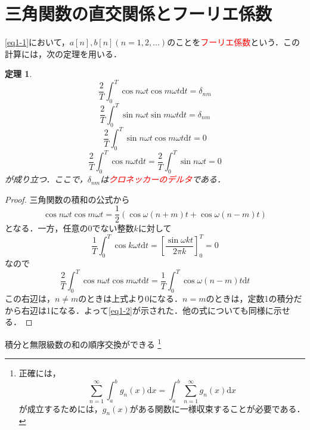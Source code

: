 \documentclass[a4j]{jsbook}
\newtheorem{theorem}{定理}
\numberwithin{theorem}{chapter}  %
\begin{document}
\section{三角関数の直交関係とフーリエ係数} \label{sec1-2}
\eqref{eq1-1}において，\(a[n], b[n](n=1, 2, \dots)\)のことを\textcolor{red}{フーリエ係数}という．この計算には，次の定理を用いる．
\begin{theorem}
\label{th1-1}
\begin{equation}
    \frac{2}{T}\int_0^T \cos n\omega t\cos m\omega t\mathrm{d}t=\delta_{nm} \label{eq1-2}
\end{equation}
\begin{equation}
    \frac{2}{T}\int_0^T \sin n\omega t\sin m\omega t\mathrm{d}t=\delta_{nm} \label{eq1-3}
\end{equation}
\begin{equation}
    \frac{2}{T}\int_0^T \sin n\omega t\cos m\omega t\mathrm{d}t=0 \label{eq1-4}
\end{equation}
\begin{equation}
    \frac{2}{T}\int_0^T \cos n\omega t\mathrm{d}t=\frac{2}{T}\int_0^T \sin n\omega t=0 \label{eq1-5}
\end{equation}
が成り立つ．ここで，\(\delta_{nm}\)は\textcolor{red}{クロネッカーのデルタ}である．
\end{theorem}
\begin{proof}
三角関数の積和の公式から
\begin{equation*}
    \cos n\omega t\cos m\omega t=\frac{1}{2}\left(\cos\omega(n+m)t+\cos\omega(n-m)t\right)
\end{equation*}
となる．一方，任意の0でない整数\(k\)に対して
\begin{equation*}
    \frac{1}{T}\int_0^T\cos k\omega t\mathrm{d}t=\left[\frac{\sin\omega kt}{2\pi k}\right]_0^T=0
\end{equation*}
なので
\begin{equation*}
    \frac{2}{T}\int_0^T \cos n\omega t\cos m\omega t\mathrm{d}t=\frac{1}{T}\int_0^T \cos\omega(n-m)t\mathrm{d}t
\end{equation*}
この右辺は，\(n\neq m\)のときは上式より0になる．\(n=m\)のときは，定数1の積分だから右辺は1になる．よって\eqref{eq1-2}が示された．他の式についても同様に示せる．
\end{proof}
積分と無限級数の和の順序交換ができる
\footnote{正確には，
\begin{equation*}
    \sum_{n=1}^\infty\int_a^b g_n(x)\mathrm{d}x=\int_a^b\sum_{n=1}^\infty g_n(x)\mathrm{d}x
\end{equation*}
が成立するためには，\(g_n(x)\)がある関数に一様収束することが必要である．
}
\end{document}
